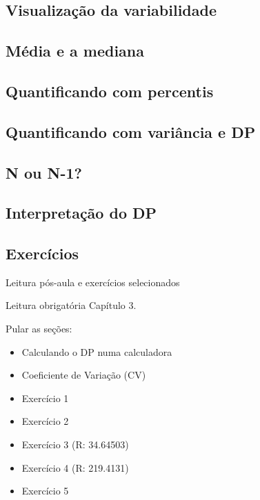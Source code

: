 \documentclass{beamer}
\begin{document}
\subsection{Visualização da variabilidade}

\subsection{Média e a mediana}

\subsection{Quantificando com percentis}

\subsection{Quantificando com variância e DP}

\subsection{N ou N-1?}

\subsection{Interpretação do DP}

\subsection{Exercícios}

\begin{frame}{Leitura pós-aula e exercícios selecionados}
  \begin{block}{Leitura obrigatória}
    Capítulo 3.

    Pular as seções:
    \begin{itemize}
    \item Calculando o DP numa calculadora
    \item Coeficiente de Variação (CV)
    \end{itemize}

  \end{block}
  \begin{itemize}
  \item Exercício 1
  \item Exercício 2
  \item Exercício 3 (R: 34.64503)
  \item Exercício 4 (R: 219.4131)
  \item Exercício 5
  \end{itemize}
\end{frame}
\end{document}
